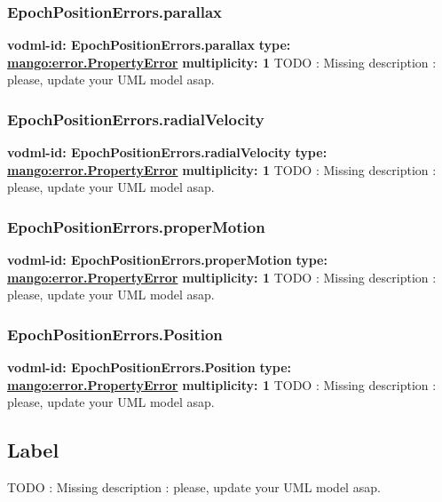     \subsubsection{EpochPositionErrors.parallax}
      \textbf{vodml-id: EpochPositionErrors.parallax} \newline
      \textbf{type: \hyperref[sect:error.PropertyError]{mango:error.PropertyError}} \newline
      \textbf{multiplicity: 1} \newline
      TODO : Missing description : please, update your UML model asap.

    \subsubsection{EpochPositionErrors.radialVelocity}
      \textbf{vodml-id: EpochPositionErrors.radialVelocity} \newline
      \textbf{type: \hyperref[sect:error.PropertyError]{mango:error.PropertyError}} \newline
      \textbf{multiplicity: 1} \newline
      TODO : Missing description : please, update your UML model asap.

    \subsubsection{EpochPositionErrors.properMotion}
      \textbf{vodml-id: EpochPositionErrors.properMotion} \newline
      \textbf{type: \hyperref[sect:error.PropertyError]{mango:error.PropertyError}} \newline
      \textbf{multiplicity: 1} \newline
      TODO : Missing description : please, update your UML model asap.

    \subsubsection{EpochPositionErrors.Position}
      \textbf{vodml-id: EpochPositionErrors.Position} \newline
      \textbf{type: \hyperref[sect:error.PropertyError]{mango:error.PropertyError}} \newline
      \textbf{multiplicity: 1} \newline
      TODO : Missing description : please, update your UML model asap.

  \subsection{Label}
  \label{sect:Label}
    TODO : Missing description : please, update your UML model asap.

